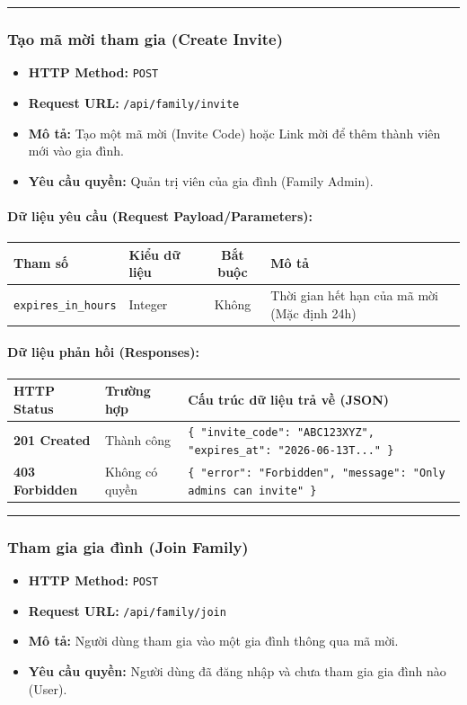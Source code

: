 \documentclass[12pt,a4paper]{article}
\begin{document}
\vskip 0.4cm
\noindent\rule{\textwidth}{0.3pt}
\vskip 0.4cm

\subsubsection{Tạo mã mời tham gia (Create Invite)}
\begin{itemize}[leftmargin=*]
    \item \textbf{HTTP Method:} \texttt{POST}
    \item \textbf{Request URL:} \texttt{/api/family/invite}
    \item \textbf{Mô tả:} Tạo một mã mời (Invite Code) hoặc Link mời để thêm thành viên mới vào gia đình.
    \item \textbf{Yêu cầu quyền:} Quản trị viên của gia đình (Family Admin).
\end{itemize}

\paragraph{Dữ liệu yêu cầu (Request Payload/Parameters):}
\begin{longtable}{|p{2.8cm}|p{2.2cm}|c|p{7.0cm}|}
\hline
\textbf{Tham số} & \textbf{Kiểu dữ liệu} & \textbf{Bắt buộc} & \textbf{Mô tả} \\ \hline
\endhead
\texttt{expires\_in\_hours} & Integer & Không & Thời gian hết hạn của mã mời (Mặc định 24h) \\ \hline
\end{longtable}

\paragraph{Dữ liệu phản hồi (Responses):}
\begin{longtable}{|p{2.8cm}|p{3.2cm}|p{8.0cm}|}
\hline
\textbf{HTTP Status} & \textbf{Trường hợp} & \textbf{Cấu trúc dữ liệu trả về (JSON)} \\ \hline
\endhead
\textbf{201 Created} & Thành công & \texttt{\{ "invite\_code": "ABC123XYZ", "expires\_at": "2026-06-13T..." \}} \\ \hline
\textbf{403 Forbidden} & Không có quyền & \texttt{\{ "error": "Forbidden", "message": "Only admins can invite" \}} \\ \hline
\end{longtable}

\vskip 0.4cm
\noindent\rule{\textwidth}{0.3pt}
\vskip 0.4cm

\subsubsection{Tham gia gia đình (Join Family)}
\begin{itemize}[leftmargin=*]
    \item \textbf{HTTP Method:} \texttt{POST}
    \item \textbf{Request URL:} \texttt{/api/family/join}
    \item \textbf{Mô tả:} Người dùng tham gia vào một gia đình thông qua mã mời.
    \item \textbf{Yêu cầu quyền:} Người dùng đã đăng nhập và chưa tham gia gia đình nào (User).
\end{itemize}
\end{document}
